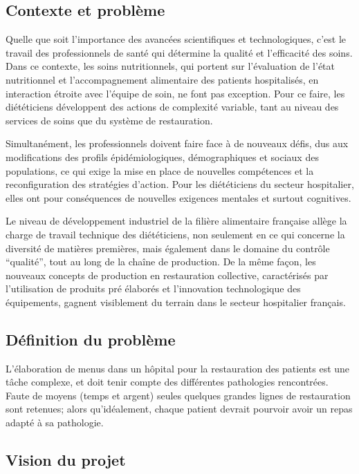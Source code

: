 \textcolor[RGB]{46, 116, 181}{\chapter{Contexte et problème}}
Quelle que soit l’importance des avancées scientifiques et technologiques, c’est le travail des
professionnels de santé qui détermine la qualité et l’efficacité des soins. Dans ce contexte, les soins
nutritionnels, qui portent sur l’évaluation de l’état nutritionnel et l’accompagnement alimentaire des
patients hospitalisés, en interaction étroite avec l’équipe de soin, ne font pas exception. Pour ce
faire, les diététiciens développent des actions de complexité variable, tant au niveau des services de
soins que du système de restauration.

Simultanément, les professionnels doivent faire face à de nouveaux défis, dus aux modifications des
profils épidémiologiques, démographiques et sociaux des populations, ce qui exige la mise en place
de nouvelles compétences et la reconfiguration des stratégies d’action. Pour les diététiciens du
secteur hospitalier, elles ont pour conséquences de nouvelles exigences mentales et surtout
cognitives.

Le niveau de développement industriel de la filière alimentaire française allège la charge de travail
technique des diététiciens, non seulement en ce qui concerne la diversité de matières premières,
mais également dans le domaine du contrôle \enquote{qualité}, tout au long de la chaîne de production. De
la même façon, les nouveaux concepts de production en restauration collective, caractérisés par
l’utilisation de produits pré élaborés et l’innovation technologique des équipements, gagnent
visiblement du terrain dans le secteur hospitalier français.

\section{Définition du problème}
L'élaboration de menus dans un hôpital pour la restauration des patients
est une tâche complexe, et doit tenir compte des différentes pathologies
rencontrées. Faute de moyens (temps et argent) seules quelques grandes
lignes de restauration sont retenues; alors qu'idéalement, chaque
patient devrait pourvoir avoir un repas adapté à sa pathologie.

\section{Vision du projet}
